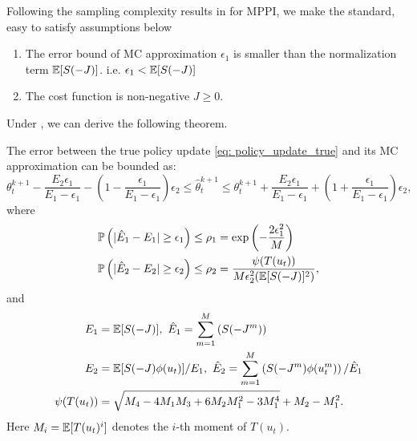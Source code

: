\documentclass[twoside,11pt]{article}
\begin{document}
Following the sampling complexity results in \cite{yoon2022sampling} for \ac{MPPI}, we make the standard, easy to satisfy assumptions below
\begin{assumption}\label{assump: sample_complexity}
\begin{enumerate}[label=(\alph*)]
\item The error bound of \ac{MC} approximation $\epsilon_1$ is smaller than the normalization term $\mathbb{E}[S(-J)]$. i.e. $\epsilon_1 < \mathbb{E}[S(-J)]$
\item The cost function is non-negative $J\geq 0$.
\end{enumerate}
\end{assumption}
Under , we can derive the following theorem.
\begin{theorem}\label{theorem: complexity}
The error between the true policy update \eqref{eq: policy_update_true} and its \ac{MC} approximation can be bounded as:
\begin{equation} \label{eq: error_bound}
\theta^{k+1}_t - \frac{E_2\epsilon_1}{E_1-\epsilon_1}-\left(1-\frac{\epsilon_1}{E_1-\epsilon_1}\right)\epsilon_2\leq \hat{\theta}^{k+1}_t \leq \theta^{k+1}_t + \frac{E_2\epsilon_1}{E_1-\epsilon_1}+\left(1+\frac{\epsilon_1}{E_1-\epsilon_1}\right)\epsilon_2,
\end{equation}
where
\begin{subequations}
\begin{align}\label{eq: hoefding}
\mathbb{P}\left(|\hat{E}_1 - E_1|\geq \epsilon_1\right)&\leq \rho_1= \exp\left(-\frac{2\epsilon_1^2}{M}\right)\\
\mathbb{P}\left(|\hat{E}_2 - E_2|\geq \epsilon_2\right)&\leq\rho_2= \frac{\psi(T(u_t))}{M\epsilon_2^2(\mathbb{E}[S(-J)]^2)}, \label{eq: error_var}
 \end{align}
\end{subequations}
and
\begin{align*}
E_1&=\mathbb{E}[S(-J)],\ \hat{E}_1=\sum^M_{m=1}\left(S(-J^m)\right)\\
E_2&=\mathbb{E}[S(-J)\phi(u_t)]/E_1,\  \hat{E}_2=\sum^M_{m=1}\left(S(-J^m)\phi(u_t^m)\right)/\hat{E}_1\\
\psi(T(u_t))&=\sqrt{M_4-4M_1M_3+6M_2M_1^2-3M_1^4}+M_2-M_1^2.
\end{align*}
Here $M_i=\mathbb{E}[T(u_t)^i]$ denotes the $i$-th moment of $T(u_t)$.
\end{theorem}
\end{document}
